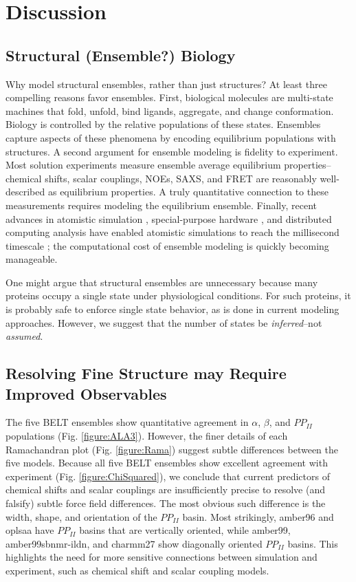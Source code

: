 \documentclass[journal=jacsat,manuscript=article]{achemso}
\begin{document}
\section{Discussion}

\subsection{Structural (Ensemble?) Biology}

Why model structural ensembles, rather than just structures?  At least three compelling reasons favor ensembles.  First, biological molecules are multi-state machines that fold, unfold, bind ligands, aggregate, and change conformation.  Biology is controlled by the relative populations of these states.  Ensembles capture aspects of these phenomena by encoding equilibrium populations with structures.  A second argument for ensemble modeling is fidelity to experiment.  Most solution experiments measure ensemble average equilibrium properties--chemical shifts, scalar couplings, NOEs, SAXS, and FRET are reasonably well-described as equilibrium properties.  A truly quantitative connection to these measurements requires modeling the equilibrium ensemble.  Finally, recent advances in atomistic simulation \cite{hess2008, pronk2013gromacs, eastman2012openmm, eastman2010openmm}, special-purpose hardware \cite{Shaw2008}, and distributed computing analysis \cite{emma, msmb2} have enabled atomistic simulations to reach 
the millisecond timescale \cite{voelz2010, bowman2011atomistic, shaw2010, Shaw2011}; the computational cost of ensemble modeling is quickly becoming manageable.

One might argue that structural ensembles are unnecessary because many proteins occupy a single state under physiological conditions.  For such proteins, it is probably safe to enforce single state behavior, as is done in current modeling approaches. However, we suggest that the number of states be \emph{inferred}--not \emph{assumed}.  


\subsection{Resolving Fine Structure may Require Improved Observables}

The five BELT ensembles show quantitative agreement in $\alpha$, $\beta$, and $PP_{II}$ populations (Fig. \ref{figure:ALA3}).  However, the finer details of each Ramachandran plot (Fig. \ref{figure:Rama}) suggest subtle differences between the 
five models.  Because all five BELT ensembles show excellent agreement with experiment (Fig. \ref{figure:ChiSquared}), we conclude that current predictors of chemical shifts and scalar couplings are insufficiently precise to resolve (and falsify) subtle force field differences.  The most obvious such difference is the width, shape, and orientation of the $PP_{II}$ basin.  Most strikingly, amber96 and oplsaa have $PP_{II}$ basins that are vertically oriented, while amber99, amber99sbnmr-ildn, and charmm27 show diagonally oriented $PP_{II}$ basins.  This highlights the need for more sensitive connections between simulation and experiment, such as chemical shift and scalar coupling models.
\end{document}
